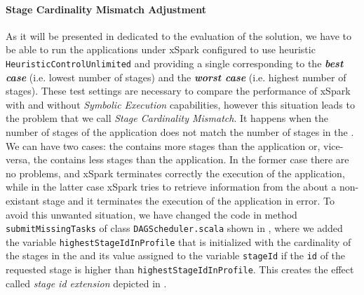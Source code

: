 

\paragraph{Stage Cardinality Mismatch Adjustment}
As it will be presented in  dedicated to the evaluation of the solution, we have to be able to run the applications under xSpark configured to use heuristic \texttt{HeuristicControlUnlimited} and providing a single \plan corresponding to the \textbf\textit{best case} (i.e. lowest number of stages) and the \textbf\textit{worst case} (i.e. highest number of stages). These test settings are necessary to compare the performance of xSpark with and without \textit{Symbolic Execution} capabilities, however this situation leads  to the problem that we call \textit{Stage Cardinality Mismatch}. It happens when the number of stages of the application does not match the number of stages in the \plan. We can have two cases: the \plan contains more stages than the application or, vice-versa, the \plan contains less stages than the application. In the former case there are no problems, and  xSpark terminates correctly the execution of the application, while in the latter case xSpark tries to  retrieve information from the \plan about a non-existant stage and it terminates the execution of the application in error. To avoid this unwanted situation, we have changed the code in method \texttt{submitMissingTasks} of class \texttt{DAGScheduler.scala} shown in , where we added the variable \texttt{highestStageIdInProfile} that is initialized with the cardinality of the stages in the \plan and its value assigned to the variable \texttt{stageId} if the \texttt{id} of the requested stage is higher than \texttt{highestStageIdInProfile}. This creates the effect called \textit{stage id extension} depicted in .
